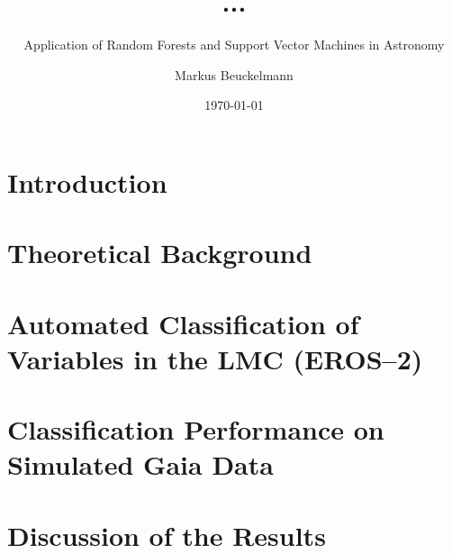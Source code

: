 

\title{...}
\subtitle{Application of Random Forests and Support Vector Machines in Astronomy}

\author{Markus Beuckelmann}
\date{\today}






\label{sec:abstract}

\tableofcontents

\newpage

\chapter{Introduction}
\label{sec:introduction}


\let\cleardoublepage\clearpage
\chapter{Theoretical Background}
\label{sec:theory}


\chapter{Automated Classification of Variables in the LMC (EROS--2)}
\label{sec:main}


\chapter{Classification Performance on Simulated Gaia Data}
\label{sec:main-gaia}


\chapter{Discussion of the Results}
\label{sec:discussion}


\cleardoublepage
{}
\listoffigures

\cleardoublepage
{}




\clearpage
{}

\label{sec:declaration}


